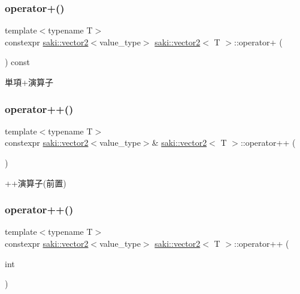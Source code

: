\subsubsection{\texorpdfstring{operator+()}{operator+()}}
{\footnotesize\ttfamily template$<$typename T$>$ \\
constexpr \mbox{\hyperlink{classsaki_1_1vector2}{saki\+::vector2}}$<$value\+\_\+type$>$ \mbox{\hyperlink{classsaki_1_1vector2}{saki\+::vector2}}$<$ T $>$\+::operator+ (\begin{DoxyParamCaption}{ }\end{DoxyParamCaption}) const\hspace{0.3cm}{\ttfamily [inline]}}



単項+演算子 

\mbox{\label{classsaki_1_1vector2_a47ae623f11d6f9cde6230b0d934bd54e}} 
\subsubsection{\texorpdfstring{operator++()}{operator++()}\hspace{0.1cm}{\footnotesize\ttfamily [1/2]}}
{\footnotesize\ttfamily template$<$typename T$>$ \\
constexpr \mbox{\hyperlink{classsaki_1_1vector2}{saki\+::vector2}}$<$value\+\_\+type$>$\& \mbox{\hyperlink{classsaki_1_1vector2}{saki\+::vector2}}$<$ T $>$\+::operator++ (\begin{DoxyParamCaption}{ }\end{DoxyParamCaption})\hspace{0.3cm}{\ttfamily [inline]}}



++演算子(前置) 

\mbox{\label{classsaki_1_1vector2_a04318d78cb10edb8a48d149254275a2b}} 
\subsubsection{\texorpdfstring{operator++()}{operator++()}\hspace{0.1cm}{\footnotesize\ttfamily [2/2]}}
{\footnotesize\ttfamily template$<$typename T$>$ \\
constexpr \mbox{\hyperlink{classsaki_1_1vector2}{saki\+::vector2}}$<$value\+\_\+type$>$ \mbox{\hyperlink{classsaki_1_1vector2}{saki\+::vector2}}$<$ T $>$\+::operator++ (\begin{DoxyParamCaption}\item[{int}]{ }\end{DoxyParamCaption})\hspace{0.3cm}{\ttfamily [inline]}}



